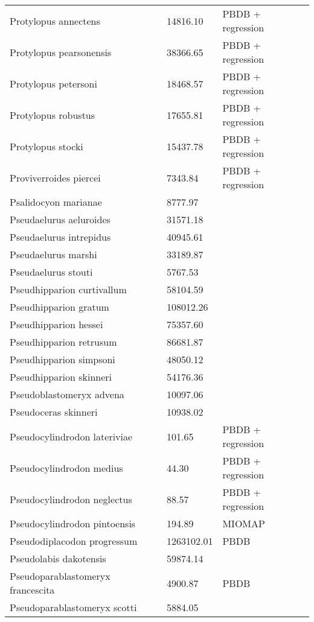 \begin{center}
\begin{longtable}{p{} p{} p{} }
  Protylopus annectens & 14816.10 & PBDB + regression \\ 
  Protylopus pearsonensis & 38366.65 & PBDB + regression \\ 
  Protylopus petersoni & 18468.57 & PBDB + regression \\ 
  Protylopus robustus & 17655.81 & PBDB + regression \\ 
  Protylopus stocki & 15437.78 & PBDB + regression \\ 
  Proviverroides piercei & 7343.84 & PBDB + regression \\ 
  Psalidocyon marianae & 8777.97 & \cite{Tomiya2013} \\ 
  Pseudaelurus aeluroides & 31571.18 & \cite{Tomiya2013} \\ 
  Pseudaelurus intrepidus & 40945.61 & \cite{Tomiya2013} \\ 
  Pseudaelurus marshi & 33189.87 & \cite{Tomiya2013} \\ 
  Pseudaelurus stouti & 5767.53 & \cite{Tomiya2013} \\ 
  Pseudhipparion curtivallum & 58104.59 & \cite{Tomiya2013} \\ 
  Pseudhipparion gratum & 108012.26 & \cite{Tomiya2013} \\ 
  Pseudhipparion hessei & 75357.60 & \cite{Tomiya2013} \\ 
  Pseudhipparion retrusum & 86681.87 & \cite{Tomiya2013} \\ 
  Pseudhipparion simpsoni & 48050.12 & \cite{Tomiya2013} \\ 
  Pseudhipparion skinneri & 54176.36 & \cite{Tomiya2013} \\ 
  Pseudoblastomeryx advena & 10097.06 & \cite{Tomiya2013} \\ 
  Pseudoceras skinneri & 10938.02 & \cite{Tomiya2013} \\ 
  Pseudocylindrodon lateriviae & 101.65 & PBDB + regression \\ 
  Pseudocylindrodon medius & 44.30 & PBDB + regression \\ 
  Pseudocylindrodon neglectus & 88.57 & PBDB + regression \\ 
  Pseudocylindrodon pintoensis & 194.89 & MIOMAP \\ 
  Pseudodiplacodon progressum & 1263102.01 & PBDB \\ 
  Pseudolabis dakotensis & 59874.14 & \cite{Tomiya2013} \\ 
  Pseudoparablastomeryx francescita & 4900.87 & PBDB \\ 
  Pseudoparablastomeryx scotti & 5884.05 & \cite{Tomiya2013} \\ 

\end{longtable}
\end{center}
